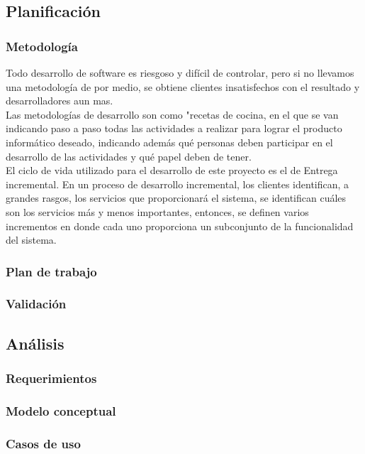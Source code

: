 \subsection{Planificación}
	\subsubsection{Metodología}
	Todo desarrollo de software es riesgoso y difícil de controlar, pero si no llevamos una metodología de por medio, se obtiene clientes insatisfechos con el resultado y desarrolladores aun mas. 
	\\
	
	Las metodologías de desarrollo son como "recetas de cocina, en el que se van indicando paso a paso todas las actividades a realizar para lograr el producto informático deseado, indicando además qué personas deben participar en el desarrollo de las actividades y qué papel deben de tener\cite{MET06}.
	\\
	
	El ciclo de vida utilizado para el desarrollo de este proyecto es el de Entrega incremental. En un proceso de desarrollo incremental, los clientes identifican, a grandes rasgos, los servicios que proporcionará el sistema, se identifican cuáles son los servicios más y menos importantes, entonces, se definen varios incrementos en donde cada uno proporciona un subconjunto de la funcionalidad del sistema.
	
	

	
	
	
	
	\subsubsection{Plan de trabajo}
	\subsubsection{Validación}
\subsection{Análisis}
	\subsubsection{Requerimientos}
	\subsubsection{Modelo conceptual}
	\subsubsection{Casos de uso}
